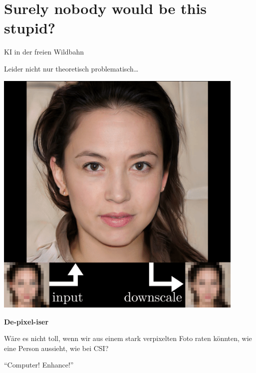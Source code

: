 \documentclass[aspectratio=43,usenames,dvipsnames]{beamer}
\begin{document}

\section{Surely nobody would be this stupid?}

\begin{frame}
\begin{center}
\Huge
KI in der freien Wildbahn
\bigskip

\Large
Leider nicht nur theoretisch problematisch\dots
\end{center}
\end{frame}

\begin{frame}
\begin{minipage}{.5\textwidth}
\includegraphics[width=0.9\textwidth, keepaspectratio]{images/step13}
\end{minipage}\begin{minipage}{.5\textwidth}
\textbf{De-pixel-iser}
\bigskip

Wäre es nicht toll, wenn wir aus einem stark verpixelten Foto raten könnten, wie eine Person aussieht, wie bei CSI?
\bigskip

``Computer! Enhance!''
\end{minipage}
\end{frame}
\end{document}

